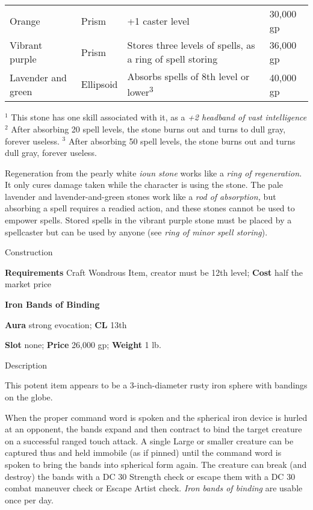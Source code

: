 \begin{figure*}[]
\begin{tabular}{llll}
Orange             & Prism          & +1 caster level                                                              & 30,000 gp             \\
Vibrant purple     & Prism          & Stores three levels of spells, as a ring of spell storing                    & 36,000 gp             \\
Lavender and green & Ellipsoid      & Absorbs spells of 8th level or lower\textsuperscript{3}                      & 40,000 gp             \\
\end{tabular}
\(^{1}\) This stone has one skill associated with it, as a \emph{+2 headband of vast intelligence}
\(^{2}\) After absorbing 20 spell levels, the stone burns out and turns to dull gray, forever useless.
\(^{3}\) After absorbing 50 spell levels, the stone burns out and turns dull gray, forever useless.
\end{figure*}

				
Regeneration from the pearly white \textit{ioun stone} works like a \textit{ring of regeneration.} It only cures damage taken while the character is using the stone. The pale lavender and lavender-and-green stones work like a \textit{rod of absorption,} but absorbing a spell requires a readied action, and these stones cannot be used to empower spells. Stored spells in the vibrant purple stone must be placed by a spellcaster but can be used by anyone (see \textit{ring of minor spell storing}). 
				
Construction
				
\textbf{Requirements} Craft Wondrous Item, creator must be 12th level;\textbf{ Cost }half the market price
				
\textbf{Iron Bands of Binding}
				
\textbf{Aura} strong evocation;\textbf{ CL }13th
				
\textbf{Slot} none; \textbf{Price} 26,000 gp; \textbf{Weight} 1 lb.
				
Description
				
This potent item appears to be a 3-inch-diameter rusty iron sphere with bandings on the globe.
				
When the proper command word is spoken and the spherical iron device is hurled at an opponent, the bands expand and then contract to bind the target creature on a successful ranged touch attack. A single Large or smaller creature can be captured thus and held immobile (as if pinned) until the command word is spoken to bring the bands into spherical form again. The creature can break (and destroy) the bands with a DC 30 Strength check or escape them with a DC 30 combat maneuver check or Escape Artist check. \textit{Iron bands of binding} are usable once per day. 
				
